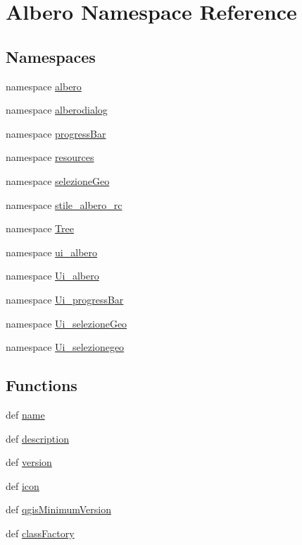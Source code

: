 \hypertarget{namespaceAlbero}{
\section{Albero Namespace Reference}
\label{namespaceAlbero}
}
\subsection*{Namespaces}
\begin{DoxyCompactItemize}
\item 
namespace \hyperlink{namespaceAlbero_1_1albero}{albero}
\item 
namespace \hyperlink{namespaceAlbero_1_1alberodialog}{alberodialog}
\item 
namespace \hyperlink{namespaceAlbero_1_1progressBar}{progressBar}
\item 
namespace \hyperlink{namespaceAlbero_1_1resources}{resources}
\item 
namespace \hyperlink{namespaceAlbero_1_1selezioneGeo}{selezioneGeo}
\item 
namespace \hyperlink{namespaceAlbero_1_1stile__albero__rc}{stile\_\-albero\_\-rc}
\item 
namespace \hyperlink{namespaceAlbero_1_1Tree}{Tree}
\item 
namespace \hyperlink{namespaceAlbero_1_1ui__albero}{ui\_\-albero}
\item 
namespace \hyperlink{namespaceAlbero_1_1Ui__albero}{Ui\_\-albero}
\item 
namespace \hyperlink{namespaceAlbero_1_1Ui__progressBar}{Ui\_\-progressBar}
\item 
namespace \hyperlink{namespaceAlbero_1_1Ui__selezioneGeo}{Ui\_\-selezioneGeo}
\item 
namespace \hyperlink{namespaceAlbero_1_1Ui__selezionegeo}{Ui\_\-selezionegeo}
\end{DoxyCompactItemize}
\subsection*{Functions}
\begin{DoxyCompactItemize}
\item 
def \hyperlink{namespaceAlbero_ab9a1eb22d4e07b8347d290d1dc90ec53}{name}
\item 
def \hyperlink{namespaceAlbero_a1d0c47d8247e4575410461fe527c3f68}{description}
\item 
def \hyperlink{namespaceAlbero_a9b7f219142821b23616d0cef9f41eab4}{version}
\item 
def \hyperlink{namespaceAlbero_a7ecf1d8431174cd57e65a1e320d45faf}{icon}
\item 
def \hyperlink{namespaceAlbero_a18cdc56f170ede4e06233e1a38628449}{qgisMinimumVersion}
\item 
def \hyperlink{namespaceAlbero_aa17995397961a76820853939ab0b00db}{classFactory}
\end{DoxyCompactItemize}


